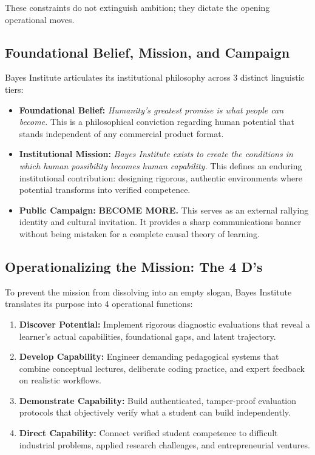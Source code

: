 These constraints do not extinguish ambition; they dictate the opening operational moves.

\subsection{Foundational Belief, Mission, and Campaign}

Bayes Institute articulates its institutional philosophy across 3 distinct linguistic tiers:

\begin{itemize}[leftmargin=11pt,itemsep=2pt,topsep=1.5pt,parsep=0pt]
  \item \textbf{Foundational Belief:} \textit{Humanity's greatest promise is what people can become.} This is a philosophical conviction regarding human potential that stands independent of any commercial product format.
  \item \textbf{Institutional Mission:} \textit{Bayes Institute exists to create the conditions in which human possibility becomes human capability.} This defines an enduring institutional contribution: designing rigorous, authentic environments where potential transforms into verified competence.
  \item \textbf{Public Campaign:} \textbf{BECOME MORE.} This serves as an external rallying identity and cultural invitation. It provides a sharp communications banner without being mistaken for a complete causal theory of learning.
\end{itemize}

\subsection{Operationalizing the Mission: The 4 D's}

To prevent the mission from dissolving into an empty slogan, Bayes Institute translates its purpose into 4 operational functions:

\begin{enumerate}[leftmargin=12pt,itemsep=2pt,topsep=1pt,parsep=0pt]
  \item \textbf{Discover Potential:} Implement rigorous diagnostic evaluations that reveal a learner's actual capabilities, foundational gaps, and latent trajectory.
  \item \textbf{Develop Capability:} Engineer demanding pedagogical systems that combine conceptual lectures, deliberate coding practice, and expert feedback on realistic workflows.
  \item \textbf{Demonstrate Capability:} Build authenticated, tamper-proof evaluation protocols that objectively verify what a student can build independently.
  \item \textbf{Direct Capability:} Connect verified student competence to difficult industrial problems, applied research challenges, and entrepreneurial ventures.
\end{enumerate}


